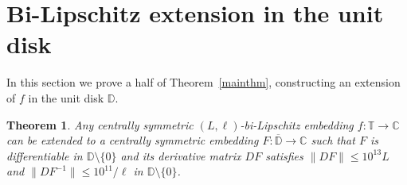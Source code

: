 \documentclass[11pt]{amsart}
\newtheorem{theorem}{Theorem}[section]
\theoremstyle{remark}
\numberwithin{equation}{section}
\newcommand{\C}{\mathbb{C}}
\newcommand{\DD}{\mathbb{D}}
\newcommand{\T}{\mathbb{T}}
\newcommand{\norm}[1]{\lVert#1\rVert}
\begin{document}
\section{Bi-Lipschitz extension in the unit disk}\label{disksec}

In this section we prove a half of Theorem~\ref{mainthm}, constructing an extension of $f$ in the unit disk $\DD$.

\begin{theorem}\label{mainthmInt} Any centrally symmetric $(L,\ell)$-bi-Lipschitz embedding $f\colon \T\to \C$ can be extended to a centrally symmetric embedding $F\colon \overline{\DD}\to\C$  such that $F$ is differentiable in $\DD\setminus\{0\}$ and its derivative matrix $DF$ satisfies $\norm{DF}\le 10^{13} L$ and $\norm{DF^{-1}} \le 10^{11} / \ell$ in $\DD\setminus\{0\}$.
\end{theorem}
\end{document}
